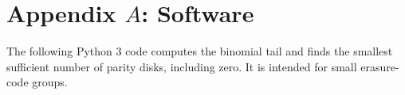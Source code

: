 \section{Appendix $A$: Software}

The following Python 3 code computes the binomial tail and finds the
smallest sufficient number of parity disks, including zero.
It is intended for small erasure-code groups.

{\small

}

